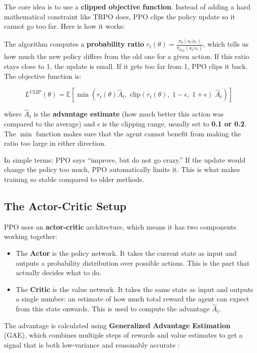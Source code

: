 The core idea is to use a \textbf{clipped objective function}. Instead of adding a hard mathematical constraint like TRPO does, PPO clips the policy update so it cannot go too far. Here is how it works:

The algorithm computes a \textbf{probability ratio} $r_t(\theta) = \frac{\pi_\theta(a_t|s_t)}{\pi_{\theta_\text{old}}(a_t|s_t)}$, which tells us how much the new policy differs from the old one for a given action. If this ratio stays close to 1, the update is small. If it gets too far from 1, PPO clips it back. The objective function is:

$$L^{\text{CLIP}}(\theta) = \mathbb{E}\left[\min\left(r_t(\theta) \hat{A}_t,\; \text{clip}(r_t(\theta),\; 1-\epsilon,\; 1+\epsilon)\; \hat{A}_t\right)\right]$$

where $\hat{A}_t$ is the \textbf{advantage estimate} (how much better this action was compared to the average) and $\epsilon$ is the clipping range, usually set to \textbf{0.1 or 0.2}. The $\min$ function makes sure that the agent cannot benefit from making the ratio too large in either direction.

In simple terms: PPO says ``improve, but do not go crazy.'' If the update would change the policy too much, PPO automatically limits it. This is what makes training so stable compared to older methods.


\subsection{The Actor-Critic Setup}

PPO uses an \textbf{actor-critic} architecture, which means it has two components working together:

\begin{itemize}
\item The \textbf{Actor} is the policy network. It takes the current state as input and outputs a probability distribution over possible actions. This is the part that actually decides what to do.
\item The \textbf{Critic} is the value network. It takes the same state as input and outputs a single number: an estimate of how much total reward the agent can expect from this state onwards. This is used to compute the advantage $\hat{A}_t$.
\end{itemize}

The advantage is calculated using \textbf{Generalized Advantage Estimation} (GAE), which combines multiple steps of rewards and value estimates to get a signal that is both low-variance and reasonably accurate \cite{schulman2016gae}:

